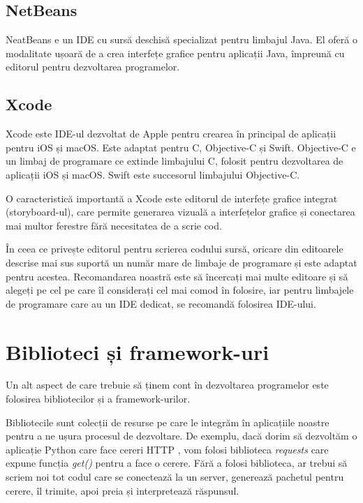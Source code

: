 \subsection{NetBeans}
\label{sec:appdev-ide-netbeans}

NeatBeans e un IDE cu sursă deschisă specializat pentru limbajul Java. El oferă
o modalitate ușoară de a crea interfețe grafice pentru aplicații Java, împreună
cu editorul pentru dezvoltarea programelor.

\subsection{Xcode}
\label{sec:appdev-ide-xcode}

Xcode este IDE-ul dezvoltat de Apple pentru crearea în principal de aplicații
pentru iOS și macOS. Este adaptat pentru C, Objective-C și Swift. Objective-C e
un limbaj de programare ce extinde limbajului C, folosit pentru dezvoltarea de
aplicații iOS și macOS. Swift este succesorul limbajului Objective-C.

O caracteristică importantă a Xcode este editorul de interfețe grafice integrat
(storyboard-ul), care permite generarea vizuală a interfețelor grafice și
conectarea mai multor ferestre fără necesitatea de a scrie cod.

În ceea ce privește editorul pentru scrierea codului sursă, oricare din
editoarele descrise mai sus suportă un număr mare de limbaje de programare și
este adaptat pentru acestea. Recomandarea noastră este să încercați mai multe
editoare și să alegeți pe cel pe care îl considerați cel mai comod în folosire,
iar pentru limbajele de programare care au un IDE dedicat, se recomandă
folosirea IDE-ului.

\section{Biblioteci și framework-uri}
\label{sec:appdev-libs}

Un alt aspect de care trebuie să ținem cont în dezvoltarea programelor este
folosirea bibliotecilor și a framework-urilor.

Bibliotecile sunt colecții de resurse pe care le integrăm în aplicațiile noastre
pentru a ne ușura procesul de dezvoltare. De exemplu, dacă dorim să dezvoltăm o
aplicație Python care face cereri HTTP , vom folosi biblioteca \textit{requests} care expune funcția
\textit{get()} pentru a face o cerere. Fără a folosi biblioteca, ar trebui să
scriem noi tot codul care se conectează la un server, generează pachetul pentru
cerere, îl trimite, apoi preia și interpretează răspunsul.

